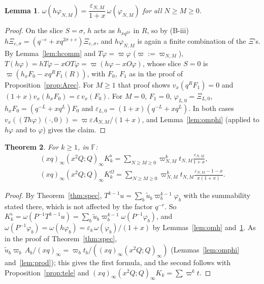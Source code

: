 \documentclass[11pt]{amsart}
\newtheorem{theorem}{Theorem}[section]
\newtheorem{lemma}[theorem]{Lemma}
\theoremstyle{definition}
\numberwithin{equation}{section}
\begin{document}
\begin{lemma}\label{lem:hphi}
$\omega(h\varphi_{N,M})=\dfrac{\varepsilon_{N,M}}{1+x}\,\omega(\varphi_{N,M})$ for all $N\ge M\ge0$.
\end{lemma}
\begin{proof}
On the slice $S=\sigma$, $h$ acts as $h_{xq^{2\sigma}}$ in $R$, so by (B-iii) $h\Xi_{e,\sigma}=(q^{-e}+xq^{2\sigma+e})\Xi_{e,\sigma}$, and
$h\varphi_{N,M}$ is again a finite combination of the $\Xi$'s. By Lemma~\ref{lem:hcomm} and $T\varphi=\varpi\varphi$
($\varpi:=\varpi_{N,M}$), $T(h\varphi)=hT\varphi-xOT\varphi=\varpi(h\varphi-xO\varphi)$, whose slice $S=0$ is
$\varpi(h_xF_0-xq^RF_1(R))$, with $F_0$, $F_1$ as in the proof of Proposition~\ref{prop:Arec}. For $M\ge1$ that proof shows
$v_x(q^RF_1)=0$ and $(1+x)v_x(h_xF_0)=\varepsilon\,v_x(F_0)$. For $M=0$, $F_1=0$, $\varphi_{L,0}=\Xi_{L,0}$,
$h_xF_0=(q^{-L}+xq^L)F_0$ and $\varepsilon_{L,0}=(1+x)(q^{-L}+xq^L)$. In both cases
$v_x((Th\varphi)(\cdot,0))=\varpi\varepsilon A_{N,M}/(1+x)$, and Lemma~\ref{lem:omphi} (applied to $h\varphi$ and to $\varphi$) gives the claim.
\end{proof}

\begin{theorem}\label{thm:specOm}
For $k\ge1$, in $\mathbb F$:
\begin{gather*}
(xq)_\infty(x^2Q;Q)_\infty K^\flat_k=\sum_{N\ge M\ge0}\varpi^k_{N,M}t_{N,M}\frac{\varepsilon_{N,M}}{1+x},\\
(xq)_\infty(x^2Q;Q)_\infty K^\Omega_k=\sum_{N\ge M\ge0}\varpi^k_{N,M}t_{N,M}\frac{\varepsilon_{N,M}-1-x}{x(1+x)}.
\end{gather*}
\end{theorem}
\begin{proof}
By Theorem~\ref{thm:spec}, $T^{k-1}u=\sum_b\tilde u_b\varpi_b^{k-1}\varphi_b$ with the summability stated there, which is not
affected by the factor $q^{-r}$. So $K^\flat_k=\omega(P^{-1}T^{k-1}u)=\sum_b\tilde u_b\varpi_b^{k-1}\omega(P^{-1}\varphi_b)$, and
$\omega(P^{-1}\varphi_b)=\omega(h\varphi_b)=\varepsilon_b\,\omega(\varphi_b)/(1+x)$ by Lemmas~\ref{lem:omh} and~\ref{lem:hphi}. As in the
proof of Theorem~\ref{thm:spec}, $\tilde u_b\varpi_b\,A_b/(xq)_\infty=\varpi_bt_b/((xq)_\infty(x^2Q;Q)_\infty)$ (Lemmas~\ref{lem:omphi}
and~\ref{lem:prod}); this gives the first formula, and the second follows with Proposition~\ref{prop:tele} and
$(xq)_\infty(x^2Q;Q)_\infty K_k=\sum\varpi^kt$.
\end{proof}
\end{document}
